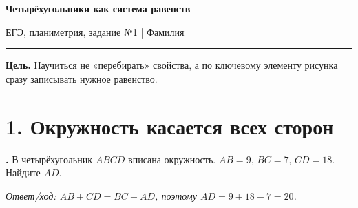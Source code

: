 
\pagestyle{fancy}
\fancyhf{}
\cfoot{\thepage}
\setlength{\headheight}{15pt}
\setlength{\parindent}{0pt}
\newcommand{\ex}{\stepcounter{exercise}\textbf{\theexercise.} }
\newcommand{\answerline}[1]{\rule{#1}{0.4pt}}
\newcommand{\teacheranswer}[1]{\ifteacher\par\smallskip\textit{Ответ/ход: #1}\par\fi}
\newcommand{\rulecard}[2]{\noindent\fbox{\begin{minipage}{.94\linewidth}\textbf{#1} \quad #2\end{minipage}}\par\smallskip}
\newcommand{\picturedtask}[3]{%
\item \begin{minipage}[t]{.65\linewidth}#1\teacheranswer{#3}\end{minipage}\hfill
\begin{minipage}[t]{.3\linewidth}\centering\resizebox{\linewidth}{!}{#2}\end{minipage}\par\medskip}


\begin{center}
{\Large\textbf{Четырёхугольники как система равенств}}\\[2mm]
{\small ЕГЭ, планиметрия, задание №1 \quad | \quad Фамилия\ \answerline{6cm}}
\end{center}
\ifteacher
\begin{center}\end{center}
\fi

\textbf{Цель.} Научиться не «перебирать» свойства, а по ключевому элементу
рисунка сразу записывать нужное равенство.

\section*{1. Окружность касается всех сторон}
\begin{minipage}[t]{.58\linewidth}
\ex В четырёхугольник \(ABCD\) вписана окружность. \(AB=9\), \(BC=7\),
\(CD=18\). Найдите \(AD\).
\teacheranswer{\(AB+CD=BC+AD\), поэтому \(AD=9+18-7=20\).}
\end{minipage}\hfill
\begin{minipage}[t]{.35\linewidth}\centering{}\end{minipage}

